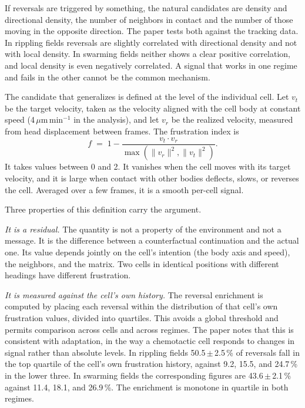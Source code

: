 \documentclass[11pt]{article}
\theoremstyle{definition}
\theoremstyle{remark}
\begin{document}
If reversals are triggered by something, the natural candidates are density and directional density, the number of neighbors in contact and the number of those moving in the opposite direction. The paper tests both against the tracking data. In rippling fields reversals are slightly correlated with directional density and not with local density. In swarming fields neither shows a clear positive correlation, and local density is even negatively correlated. A signal that works in one regime and fails in the other cannot be the common mechanism.

The candidate that generalizes is defined at the level of the individual cell. Let $v_t$ be the target velocity, taken as the velocity aligned with the cell body at constant speed (4\,$\mu$m\,min$^{-1}$ in the analysis), and let $v_r$ be the realized velocity, measured from head displacement between frames. The frustration index is
\begin{equation}
  f \;=\; 1-\frac{v_t\cdot v_r}{\max\!\left(\lVert v_r\rVert^{2},\lVert v_t\rVert^{2}\right)} .
  \label{eq:frustration}
\end{equation}
It takes values between 0 and 2. It vanishes when the cell moves with its target velocity, and it is large when contact with other bodies deflects, slows, or reverses the cell. Averaged over a few frames, it is a smooth per-cell signal.

Three properties of this definition carry the argument.

\emph{It is a residual.} The quantity is not a property of the environment and not a message. It is the difference between a counterfactual continuation and the actual one. Its value depends jointly on the cell's intention (the body axis and speed), the neighbors, and the matrix. Two cells in identical positions with different headings have different frustration.

\emph{It is measured against the cell's own history.} The reversal enrichment is computed by placing each reversal within the distribution of that cell's own frustration values, divided into quartiles. This avoids a global threshold and permits comparison across cells and across regimes. The paper notes that this is consistent with adaptation, in the way a chemotactic cell responds to changes in signal rather than absolute levels. In rippling fields 50.5\,$\pm$\,2.5\,\% of reversals fall in the top quartile of the cell's own frustration history, against 9.2, 15.5, and 24.7\,\% in the lower three. In swarming fields the corresponding figures are 43.6\,$\pm$\,2.1\,\% against 11.4, 18.1, and 26.9\,\%. The enrichment is monotone in quartile in both regimes.
\end{document}
